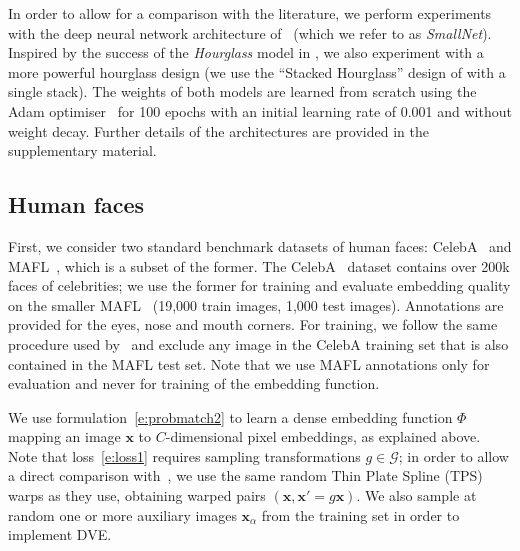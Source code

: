 \documentclass[10pt,twocolumn,letterpaper]{article}
\makeatletter
\newcommand{\bx}{\mathbf{x}}
\renewcommand{\paragraph}{\@startsection{paragraph}{4}{\z@}{0.5em}{-1em}{\normalfont\normalsize\bfseries}}
\makeatother
\begin{document}
\paragraph{Implementation details.}\label{s:details}

In order to allow for a comparison with the literature, we perform experiments with the deep neural network architecture of~\cite{thewlis17Bunsupervised} (which we refer to as \textit{SmallNet}).  Inspired by the success of the \textit{Hourglass} model in  \cite{zhang2018unsupervised}, we also experiment with a more powerful hourglass design (we use the ``Stacked Hourglass'' design of \cite{newell2016stacked} with a single stack).  The weights of both models are learned from scratch using the Adam optimiser~\cite{kingma2014adam} for 100 epochs with an initial learning rate of 0.001 and without weight decay.  Further details of the architectures are provided in the supplementary material.

\subsection{Human faces}\label{s:human}

First, we consider two standard benchmark datasets of human faces: CelebA~\cite{liu2015faceattributes} and MAFL~\cite{Zhang2016}, which is a subset of the former.
The CelebA~\cite{liu2015faceattributes} dataset contains over 200k faces of celebrities; we use the former for training and evaluate embedding quality on the smaller MAFL~\cite{Zhang2016} (19,000 train images, 1,000 test images). Annotations are provided for the eyes, nose and mouth corners.
For training, we follow the same procedure used by~\cite{thewlis17Bunsupervised} and exclude any image in the CelebA training set that is also contained in the MAFL test set.
Note that we use MAFL annotations only for evaluation and never for training of the embedding function.


We use formulation~\eqref{e:probmatch2} to learn a dense embedding function $\Phi$ mapping an image $\bx$ to $C$-dimensional pixel embeddings, as explained above.
Note that loss~\eqref{e:loss1} requires sampling transformations $g\in\mathcal{G}$; in order to allow a direct comparison with~\cite{thewlis17Bunsupervised}, we use the same random Thin Plate Spline (TPS) warps as they use, obtaining warped pairs $(\bx,\bx'=g\bx)$.  We also sample at random one or more auxiliary images $\bx_{\alpha}$ from the training set in order to implement {DVE}.
\end{document}

